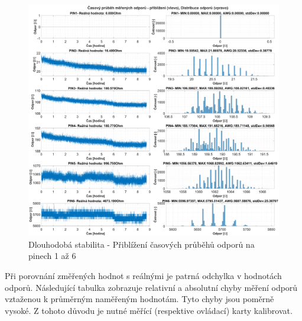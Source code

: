 \clearpage
\begin{figure}[ht!]
    \centering
    \includegraphics[width = 1\textwidth]{obrazky/matlab_generated/VOLTAGE_TESTER/dlouhodoba_stabilita_resistor_part1.eps}
    \caption{Dlouhodobá stabilita - Přiblížení časových průběhů odporů na pinech 1 až 6}
    \label{fig: 10hourTest Resistor PINS1TO4}
\end{figure}

Při porovnání změřených hodnot s reálnými je patrná odchylka v hodnotách odporů. Následující tabulka zobrazuje relativní a absolutní
chyby měření odporů vztaženou k průměrným naměřeným hodnotám. Tyto chyby jsou poměrně vysoké. Z tohoto důvodu je nutné měřící (respektive ovládací) karty kalibrovat.

\begin{table}[ht!]
    \centering
    \caption{Chyby měření odporů vůči pinu č. 1 nezkalibrované měřící karty}
    \label{tab:chyby mereni necal}
    \end{table}

